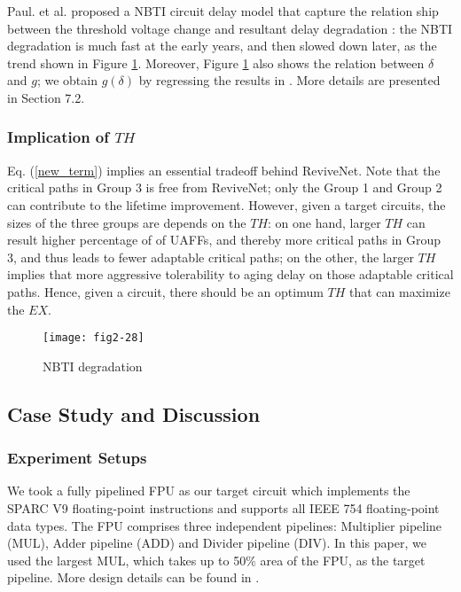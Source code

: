 Paul. et al. proposed a NBTI circuit delay model that capture the relation ship between the threshold voltage change and resultant delay degradation \cite{NBTI_Impact05}: the NBTI degradation is much fast at the early years, and then slowed down later, as the trend shown in Figure \ref{nbti}. Moreover, Figure \ref{nbti} also shows the relation between $\delta$ and $g$; we obtain $g(\delta)$ by regressing the results in \cite{wang2007impact}. More details are presented in Section 7.2.


\subsubsection{Implication of $TH$}\label{sec:th}
Eq. (\ref{new_term}) implies an essential tradeoff behind ReviveNet. Note that the critical paths in Group 3 is free from ReviveNet; only the Group 1 and Group 2 can contribute to the lifetime improvement. However, given a target circuits, the sizes of the three groups are depends on the $TH$: on one hand, larger $TH$ can result higher percentage of of UAFFs, and thereby more critical paths in Group 3, and thus leads to fewer adaptable critical paths; on the other, the larger $TH$ implies that more aggressive tolerability to aging delay on those adaptable critical paths. Hence, given a circuit, there should be an optimum $TH$ that can maximize the $EX$.


\begin{figure}[t]
\centering
\texttt{[image: fig2-28]}%
\vspace{-0.3cm}
   \caption{NBTI degradation}\label{nbti}
\end{figure}

\subsection{Case Study and Discussion}\label{section_casestudy}
\subsubsection{Experiment Setups}
We took a fully pipelined FPU \cite{OpenSPARC_06} as our target circuit which implements the SPARC V9 floating-point instructions and supports all IEEE 754 floating-point data types. The FPU comprises three independent pipelines: Multiplier pipeline (MUL), Adder pipeline (ADD) and Divider pipeline (DIV). In this paper, we used the largest MUL, which takes up to 50\% area of the FPU, as the target pipeline. More design details can be found in \cite{OpenSPARC_06}.

